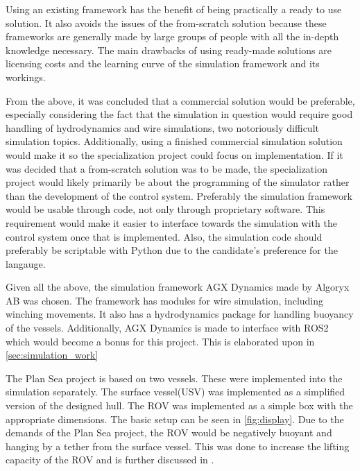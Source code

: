 \documentclass[class=article, crop=false, draft=true]{standalone}
\begin{document}
Using an existing framework has the benefit of being practically a ready to use solution. It also avoids the issues of the from-scratch solution because these frameworks are generally made by large groups of people with all the in-depth knowledge necessary. The main drawbacks of using ready-made solutions are licensing costs and the learning curve of the simulation framework and its workings.

From the above, it was concluded that a commercial solution would be preferable, especially considering the fact that the simulation in question would require good handling of hydrodynamics and wire simulations, two notoriously difficult simulation topics. Additionally, using a finished commercial simulation solution would make it so the specialization project could focus on implementation. If it was decided that a from-scratch solution was to be made, the specialization project would likely primarily be about the programming of the simulator rather than the development of the control system. Preferably the simulation framework would be usable through code, not only through proprietary software. This requirement would make it easier to interface towards the simulation with the control system once that is implemented. Also, the simulation code should preferably be scriptable with Python due to the candidate's preference for the langauge.

Given all the above, the simulation framework AGX Dynamics made by Algoryx AB was chosen. The framework has modules for wire simulation, including winching movements. It also has a hydrodynamics package for handling buoyancy of the vessels. Additionally, AGX Dynamics is made to interface with ROS2 which would become a bonus for this project. This is elaborated upon in \cref{sec:simulation_work}

The Plan Sea project is based on two vessels. These were implemented into the simulation separately. The surface vessel(USV) was implemented as a simplified version of the designed hull.  The ROV was implemented as a simple box with  the appropriate dimensions. The basic setup can be seen in  \cref{fig:display}. Due to the demands of the Plan Sea project, the ROV would be negatively buoyant and hanging by a tether from the surface vessel. This was done to increase the lifting capacity of the ROV and is further discussed in \citet{specialization}.
\end{document}
